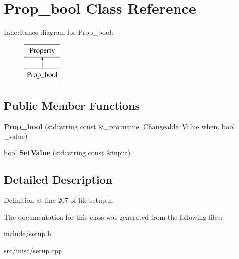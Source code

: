 \hypertarget{classProp__bool}{\section{Prop\-\_\-bool Class Reference}
\label{classProp__bool}
}
Inheritance diagram for Prop\-\_\-bool\-:\begin{figure}[H]
\begin{center}
\leavevmode
\includegraphics[height=2.000000cm]{classProp__bool}
\end{center}
\end{figure}
\subsection*{Public Member Functions}
\begin{DoxyCompactItemize}
\item 
\hypertarget{classProp__bool_ab70b5efc7550776962b20ecc1fd329ca}{{\bfseries Prop\-\_\-bool} (std\-::string const \&\-\_\-propname, Changeable\-::\-Value when, bool \-\_\-value)}\label{classProp__bool_ab70b5efc7550776962b20ecc1fd329ca}

\item 
\hypertarget{classProp__bool_a3027dcac0a1334e6b6912d99902b0b26}{bool {\bfseries Set\-Value} (std\-::string const \&input)}\label{classProp__bool_a3027dcac0a1334e6b6912d99902b0b26}

\end{DoxyCompactItemize}


\subsection{Detailed Description}


Definition at line 207 of file setup.\-h.



The documentation for this class was generated from the following files\-:\begin{DoxyCompactItemize}
\item 
include/setup.\-h\item 
src/misc/setup.\-cpp\end{DoxyCompactItemize}
